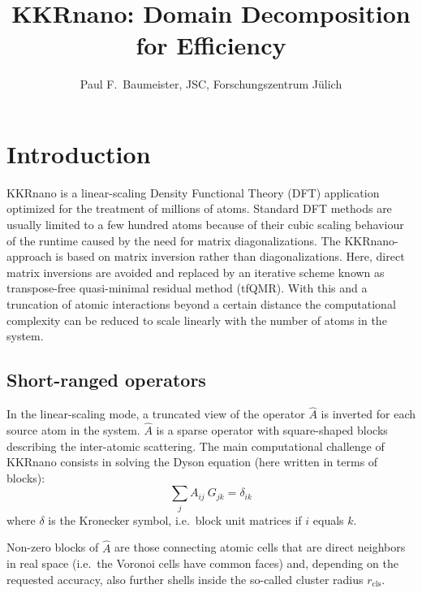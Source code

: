 \documentclass[a4paper]{article}
\newcommand{\um}[1]{_{\mathrm{#1}}}
\begin{document}
\title{KKRnano: Domain Decomposition for Efficiency}
\author{
        Paul F.~Baumeister, JSC, Forschungszentrum J{\"u}lich
        }
\date{}

\maketitle

\section{Introduction} \label{sec:introduction}

KKRnano is a linear-scaling Density Functional Theory (DFT) application
optimized for the treatment of millions of atoms.
Standard DFT methods are usually limited to a few hundred atoms because of
their cubic scaling behaviour of the runtime caused by the need for matrix diagonalizations.
The KKRnano-approach is based on matrix inversion rather than diagonalizations. 
Here, direct matrix inversions are avoided and replaced by
an iterative scheme known as transpose-free quasi-minimal residual method (tfQMR).
With this and a truncation of atomic interactions beyond a certain distance
the computational complexity can be reduced to scale linearly 
with the number of atoms in the system.\cite{zeller_towards_2008,kkrnano:thiess_massively_2012}

\subsection{Short-ranged operators} \label{sec:short-ranged_operators}

In the linear-scaling mode, a truncated view of the operator $\hat A$ 
is inverted for each source atom in the system.
$\hat A$ is a sparse operator with square-shaped blocks describing
the inter-atomic scattering.
The main computational challenge of KKRnano consists in solving
the Dyson equation (here written in terms of blocks):
\begin{equation}
 \sum_j A_{ij} \ G_{jk} = \delta_{ik}
\end{equation}
where $\delta$ is the Kronecker symbol, i.e.~block unit matrices if $i$ equals $k$.

Non-zero blocks of $\hat A$ are those connecting atomic cells that are direct neighbors in real space
(i.e.~the Voronoi cells have common faces) and, depending on the requested accuracy,
also further shells inside the so-called cluster radius $r\um{cls}$.
\end{document}
